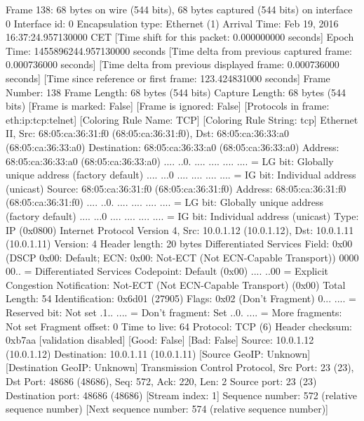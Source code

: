 Frame 138: 68 bytes on wire (544 bits), 68 bytes captured (544 bits) on interface 0
    Interface id: 0
    Encapsulation type: Ethernet (1)
    Arrival Time: Feb 19, 2016 16:37:24.957130000 CET
    [Time shift for this packet: 0.000000000 seconds]
    Epoch Time: 1455896244.957130000 seconds
    [Time delta from previous captured frame: 0.000736000 seconds]
    [Time delta from previous displayed frame: 0.000736000 seconds]
    [Time since reference or first frame: 123.424831000 seconds]
    Frame Number: 138
    Frame Length: 68 bytes (544 bits)
    Capture Length: 68 bytes (544 bits)
    [Frame is marked: False]
    [Frame is ignored: False]
    [Protocols in frame: eth:ip:tcp:telnet]
    [Coloring Rule Name: TCP]
    [Coloring Rule String: tcp]
Ethernet II, Src: 68:05:ca:36:31:f0 (68:05:ca:36:31:f0), Dst: 68:05:ca:36:33:a0 (68:05:ca:36:33:a0)
    Destination: 68:05:ca:36:33:a0 (68:05:ca:36:33:a0)
        Address: 68:05:ca:36:33:a0 (68:05:ca:36:33:a0)
        .... ..0. .... .... .... .... = LG bit: Globally unique address (factory default)
        .... ...0 .... .... .... .... = IG bit: Individual address (unicast)
    Source: 68:05:ca:36:31:f0 (68:05:ca:36:31:f0)
        Address: 68:05:ca:36:31:f0 (68:05:ca:36:31:f0)
        .... ..0. .... .... .... .... = LG bit: Globally unique address (factory default)
        .... ...0 .... .... .... .... = IG bit: Individual address (unicast)
    Type: IP (0x0800)
Internet Protocol Version 4, Src: 10.0.1.12 (10.0.1.12), Dst: 10.0.1.11 (10.0.1.11)
    Version: 4
    Header length: 20 bytes
    Differentiated Services Field: 0x00 (DSCP 0x00: Default; ECN: 0x00: Not-ECT (Not ECN-Capable Transport))
        0000 00.. = Differentiated Services Codepoint: Default (0x00)
        .... ..00 = Explicit Congestion Notification: Not-ECT (Not ECN-Capable Transport) (0x00)
    Total Length: 54
    Identification: 0x6d01 (27905)
    Flags: 0x02 (Don't Fragment)
        0... .... = Reserved bit: Not set
        .1.. .... = Don't fragment: Set
        ..0. .... = More fragments: Not set
    Fragment offset: 0
    Time to live: 64
    Protocol: TCP (6)
    Header checksum: 0xb7aa [validation disabled]
        [Good: False]
        [Bad: False]
    Source: 10.0.1.12 (10.0.1.12)
    Destination: 10.0.1.11 (10.0.1.11)
    [Source GeoIP: Unknown]
    [Destination GeoIP: Unknown]
Transmission Control Protocol, Src Port: 23 (23), Dst Port: 48686 (48686), Seq: 572, Ack: 220, Len: 2
    Source port: 23 (23)
    Destination port: 48686 (48686)
    [Stream index: 1]
    Sequence number: 572    (relative sequence number)
    [Next sequence number: 574    (relative sequence number)]
